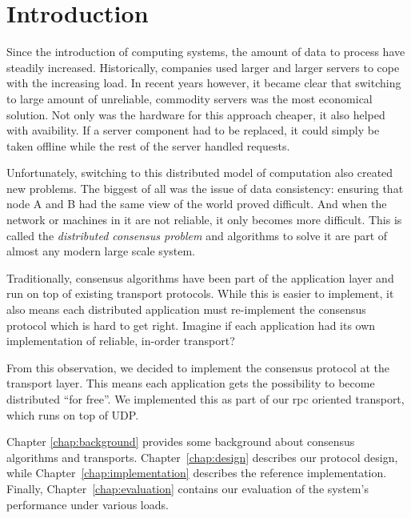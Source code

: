 \chapter{Introduction}

Since the introduction of computing systems, the amount of data to process have steadily increased.
Historically, companies used larger and larger servers to cope with the increasing load.
In recent years however, it became clear that switching to large amount of unreliable, commodity servers was the most economical solution.
Not only was the hardware for this approach cheaper, it also helped with avaibility.
If a server component had to be replaced, it could simply be taken offline while the rest of the server handled requests.

Unfortunately, switching to this distributed model of computation also created new problems.
The biggest of all was the issue of data consistency: ensuring that node A and B had the same view of the world proved difficult.
And when the network or machines in it are not reliable, it only becomes more difficult.
This is called the \emph{distributed consensus problem} and algorithms to solve it are part of almost any modern large scale system.

Traditionally, consensus algorithms have been part of the application layer and run on top of existing transport protocols.
While this is easier to implement, it also means each distributed application must re-implement the consensus protocol which is hard to get right.
Imagine if each application had its own implementation of reliable, in-order transport?

From this observation, we decided to implement the consensus protocol at the transport layer.
This means each application gets the possibility to become distributed ``for free''.
We implemented this as part of our \gls{rpc} oriented transport, which runs on top of UDP.



Chapter \ref{chap:background} provides some background about consensus algorithms and transports.
Chapter~\ref{chap:design} describes our protocol design, while Chapter~\ref{chap:implementation} describes the reference implementation.
Finally, Chapter~\ref{chap:evaluation} contains our evaluation of the system's performance under various loads.
